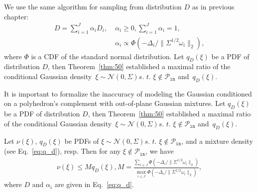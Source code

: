 We use the same algorithm for sampling from distribution $D$ as in previous chapter:
\begin{align}\label{eq:q_d}
  D = \sum_{i=1}^J \alpha_i D_i, \; & \alpha_i \ge 0, \sum_{i=1}^J \alpha_i = 1,\nonumber \\
  & \alpha_i \propto \Phi(-\Delta_i/\|\Sigma^{1/2}\omega_i\|_2),
\end{align}
where $\Phi$ is a CDF of the standard normal distribution. Let $q_D(\xi)$ be a PDF of distribution $D$, then Theorem~\ref{thm:50} established a maximal ratio of the conditional Gaussian density~$\xi\sim\mathcal{N}(0, \Sigma) \textit{s. t. } \xi\not\in\mathcal{P}_{\texttt{in}}$ and~$q_D(\xi)$.

It is important to formalize the inaccuracy of modeling the Gaussian conditioned on a polyhedron's complement with out-of-plane Gaussian mixtures.
Let $q_D(\xi)$ be a PDF of distribution $D$, then Theorem~\ref{thm:50} established a maximal ratio of the conditional Gaussian density~$\xi\sim\mathcal{N}(0, \Sigma) \textit{s. t. } \xi\not\in\mathcal{P}_{\texttt{in}}$ and~$q_D(\xi)$. 

\begin{theorem}\label{thm:50}
Let $\nu(\xi)$, $q_D(\xi)$ be PDFs  of $\xi\sim\mathcal{N}(0, \Sigma) \textit{s. t. } \xi\not\in\mathcal{P}_{\texttt{in}}$, and a mixture density (see Eq.~\eqref{eq:q_d}), resp. Then for any $\xi\not\in\mathcal{P}_{\texttt{in}}$, we have
\begin{align}\label{eq:M}
  \nu(\xi) \le M q_D(\xi),  
  M = \frac{\sum_{i\le J} \Phi(-\Delta_i/\|\Sigma^{1/2}\omega_i\|_2)
  }{\max_{i\le J}\Phi(-\Delta_i/\|\Sigma^{1/2}\omega_i\|_2)}, 
\end{align}
where $D$ and $\alpha_i$ are given in Eq.~\eqref{eq:q_d}.
\end{theorem}

